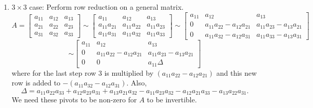 \documentclass{article}
\begin{document}
\begin{enumerate}
\begin{enumerate}
\item $3 \times 3$ case: Perform row reduction on a general matrix.
\[
A = \left[
\begin{array}{ccc}
a_{11} & a_{12} & a_{13} \\
a_{21} & a_{22} & a_{23} \\
a_{31} & a_{32} & a_{33} 
\end{array}
\right] \sim
 \left[
\begin{array}{ccc}
a_{11} & a_{12} & a_{13} \\
a_{11}a_{21} & a_{11}a_{22} & a_{11}a_{23} \\
a_{11}a_{31} & a_{11}a_{32} & a_{11}a_{33} 
\end{array}
\right] \sim
\left[
\begin{array}{ccc}
a_{11} & a_{12} & a_{13} \\
0 & a_{11}a_{22}-a_{12}a_{21} & a_{11}a_{23}-a_{13}a_{21} \\
0 & a_{11}a_{32}-a_{12}a_{31} & a_{11}a_{33}-a_{13}a_{31} 
\end{array}
\right]
\]
\[ \sim
\left[
\begin{array}{ccc}
a_{11} & a_{12} & a_{13} \\
0 & a_{11}a_{22} - a_{12}a_{21} & a_{11}a_{23}-a_{13}a_{21} \\
0 & 0 & a_{11} \Delta
\end{array}
\right] 
\]
where for the last step row 3 is multiplied by $(a_{11}a_{22}-a_{12}a_{21})$ and this new row is added to $-(a_{11}a_{32}-a_{12}a_{31})$. Also,
\[
\Delta = a_{11}a_{22}a_{33}+ a_{12}a_{23}a_{31} + a_{13}a_{21}a_{32} - a_{11}a_{23}a_{32} - a_{12}a_{21}a_{33}-a_{13}a_{22}a_{31}.
\]
We need these pivots to be non-zero for $A$ to be invertible.


\end{enumerate}
\end{enumerate}
\end{document}
